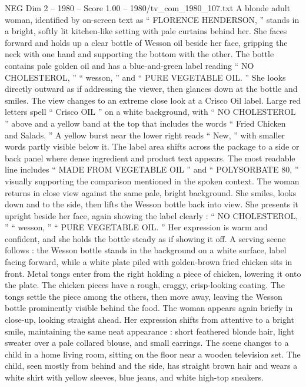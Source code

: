 \begin{textsample}{NEG Dim 2 – 1980 – Score 1.00 – 1980/tv\_com\_1980\_107.txt}  \label{ex:f2_neg_036}
A blonde adult woman, identified by on-screen text as “ FLORENCE HENDERSON, ” stands in a bright, softly lit kitchen-like setting with pale curtains behind her.
She faces forward and holds up a clear bottle of Wesson oil beside her face, gripping the neck with one hand and supporting the bottom with the other.
The bottle contains pale golden oil and has a blue-and-green label reading “ NO CHOLESTEROL, ” “ wesson, ” and “ PURE VEGETABLE OIL. ” She looks directly outward as if addressing the viewer, then glances down at the bottle and smiles.
The view changes to an extreme close look at a Crisco Oil label.
Large red letters spell “ Crisco OIL ” on a white background, with “ NO CHOLESTEROL ” above and a yellow band at the top that includes the words “ Fried Chicken and Salads. ” A yellow burst near the lower right reads “ New, ” with smaller words partly visible below it.
The label area shifts across the package to a side or back panel where dense ingredient and product text appears.
The most readable line includes “ MADE FROM VEGETABLE OIL ” and “ POLYSORBATE 80, ” visually supporting the comparison mentioned in the spoken context.
The woman returns in close view against the same pale, bright background.
She smiles, looks down and to the side, then lifts the Wesson bottle back into view.
She presents it upright beside her face, again showing the label clearly : “ NO CHOLESTEROL, ” “ wesson, ” “ PURE VEGETABLE OIL. ” Her expression is warm and confident, and she holds the bottle steady as if showing it off.
A serving scene follows : the Wesson bottle stands in the background on a white surface, label facing forward, while a white plate piled with golden-brown fried chicken sits in front.
Metal tongs enter from the right holding a piece of chicken, lowering it onto the plate.
The chicken pieces have a rough, craggy, crisp-looking coating.
The tongs settle the piece among the others, then move away, leaving the Wesson bottle prominently visible behind the food.
The woman appears again briefly in close-up, looking straight ahead.
Her expression shifts from attentive to a bright smile, maintaining the same neat appearance : short feathered blonde hair, light sweater over a pale collared blouse, and small earrings.
The scene changes to a child in a home living room, sitting on the floor near a wooden television set.
The child, seen mostly from behind and the side, has straight brown hair and wears a white shirt with yellow sleeves, blue jeans, and white high-top sneakers.

\end{textsample}
